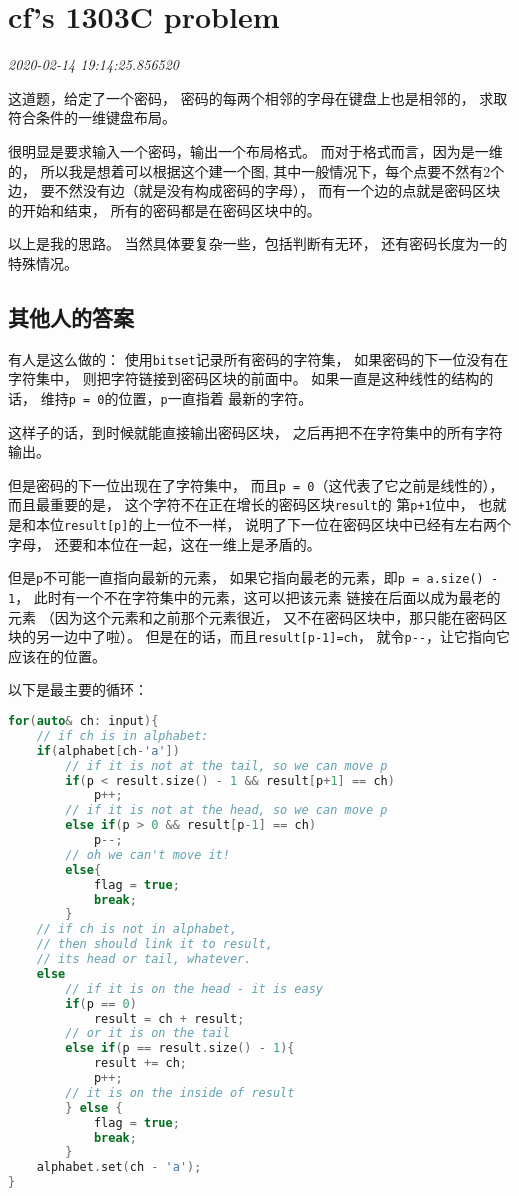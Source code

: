 \documentclass{peterlitsdoc}
\newcommand{\timetx}[1]
    {\par\noindent\emph{\pltgray\small #1}\vspace{2em}}
\newcommand{\vb}{\verb}
\begin{document}
\section{cf's 1303C problem}\timetx{2020-02-14 19:14:25.856520}

这道题，给定了一个密码，
密码的每两个相邻的字母在键盘上也是相邻的，
求取符合条件的一维键盘布局。

很明显是要求输入一个密码，输出一个布局格式。
而对于格式而言，因为是一维的，
所以我是想着可以根据这个建一个图,
其中一般情况下，每个点要不然有2个边，
要不然没有边（就是没有构成密码的字母），
而有一个边的点就是密码区块的开始和结束，
所有的密码都是在密码区块中的。

以上是我的思路。
当然具体要复杂一些，包括判断有无环，
还有密码长度为一的特殊情况。

\subsection{其他人的答案}
有人是这么做的：
使用\vb|bitset|记录所有密码的字符集，
如果密码的下一位没有在字符集中，
则把字符链接到密码区块的前面中。
如果一直是这种线性的结构的话，
维持\vb|p = 0|的位置，\vb|p|一直指着
最新的字符。

这样子的话，到时候就能直接输出密码区块，
之后再把不在字符集中的所有字符输出。

但是密码的下一位出现在了字符集中，
而且\vb|p = 0|（这代表了它之前是线性的），
而且最重要的是，
这个字符不在正在增长的密码区块\vb|result|的
第\vb|p+1|位中，
也就是和本位\vb|result[p]|的上一位不一样，
说明了下一位在密码区块中已经有左右两个字母，
还要和本位在一起，这在一维上是矛盾的。

但是\vb|p|不可能一直指向最新的元素，
如果它指向最老的元素，即\vb|p = a.size() - 1|，
此时有一个不在字符集中的元素，这可以把该元素
链接在后面以成为最老的元素
（因为这个元素和之前那个元素很近，
又不在密码区块中，那只能在密码区块的另一边中了啦）。
但是在的话，而且\vb|result[p-1]=ch|，
就令\vb|p--|，让它指向它应该在的位置。

以下是最主要的循环：
\begin{lstlisting}[language=C++]
for(auto& ch: input){
    // if ch is in alphabet:
    if(alphabet[ch-'a'])
        // if it is not at the tail, so we can move p
        if(p < result.size() - 1 && result[p+1] == ch)
            p++;
        // if it is not at the head, so we can move p
        else if(p > 0 && result[p-1] == ch)
            p--;
        // oh we can't move it!
        else{
            flag = true;
            break;
        }
    // if ch is not in alphabet, 
    // then should link it to result,
    // its head or tail, whatever.
    else
        // if it is on the head - it is easy
        if(p == 0)
            result = ch + result;
        // or it is on the tail
        else if(p == result.size() - 1){
            result += ch;
            p++;
        // it is on the inside of result
        } else {
            flag = true;
            break;
        }
    alphabet.set(ch - 'a');
}
\end{lstlisting}
\end{document}
